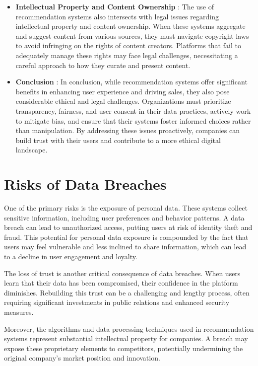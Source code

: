 \documentclass[10pt,twoside,slovak,a4paper]{article}
\begin{document}
\begin{itemize}
\item \textbf{Intellectual Property and Content Ownership} :
The use of recommendation systems also intersects with legal issues regarding intellectual property and content ownership\cite{ethical}. When these systems aggregate and suggest content from various sources, they must navigate copyright laws to avoid infringing on the rights of content creators. Platforms that fail to adequately manage these rights may face legal challenges, necessitating a careful approach to how they curate and present content.

\item \textbf{Conclusion} :
In conclusion, while recommendation systems offer significant benefits in enhancing user experience and driving sales, they also pose considerable ethical and legal challenges. Organizations must prioritize transparency, fairness, and user consent in their data practices, actively work to mitigate bias, and ensure that their systems foster informed choices rather than manipulation. By addressing these issues proactively, companies can build trust with their users and contribute to a more ethical digital landscape.

\end{itemize}



\section{Risks of Data Breaches} \label{Risks of Data Breaches}

One of the primary risks is the exposure of personal data. These systems collect sensitive information, including user preferences and behavior patterns\cite{info}. A data breach can lead to unauthorized access, putting users at risk of identity theft and fraud. This potential for personal data exposure is compounded by the fact that users may feel vulnerable and less inclined to share information, which can lead to a decline in user engagement and loyalty.

The loss of trust is another critical consequence of data breaches. When users learn that their data has been compromised, their confidence in the platform diminishes\cite{data}. Rebuilding this trust can be a challenging and lengthy process, often requiring significant investments in public relations and enhanced security measures.

Moreover, the algorithms and data processing techniques used in recommendation systems represent substantial intellectual property for companies. A breach may expose these proprietary elements to competitors, potentially undermining the original company's market position and innovation.
\end{document}
